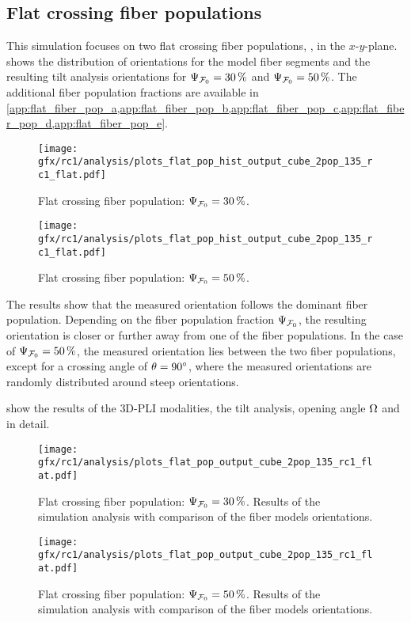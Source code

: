 \subsection{Flat crossing fiber populations}
\label{sec:resCrossFlat}
%
This simulation focuses on two flat crossing fiber populations, \ie{}, in the $x$-$y$-plane.
 shows the distribution of orientations for the model fiber segments and the resulting tilt analysis orientations for $\textnormal{$\Psi_{\textnormal{$\mathcal{F}_0$}}$} = \SI{30}{\percent}$ and $\textnormal{$\Psi_{\textnormal{$\mathcal{F}_0$}}$} = \SI{50}{\percent}$.
The additional fiber population fractions are available in \cref{app:flat_fiber_pop_a,app:flat_fiber_pop_b,app:flat_fiber_pop_c,app:flat_fiber_pop_d,app:flat_fiber_pop_e}.
\par
%
\begin{figure}[!p]
\centering
\texttt{[image: gfx/rc1/analysis/plots\_flat\_pop\_hist\_output\_cube\_2pop\_135\_rc1\_flat.pdf]}
\caption[]{Flat crossing fiber population: $\textnormal{$\Psi_{\textnormal{$\mathcal{F}_0$}}$}=\SI{30}{\percent}$.}
\label{fig:flat_03_fiber_pop_hist}
%
\vspace{2em}
\texttt{[image: gfx/rc1/analysis/plots\_flat\_pop\_hist\_output\_cube\_2pop\_135\_rc1\_flat.pdf]}
\caption[]{Flat crossing fiber population: $\textnormal{$\Psi_{\textnormal{$\mathcal{F}_0$}}$}=\SI{50}{\percent}$.}
\label{fig:flat_05_fiber_pop_hist}
\end{figure}
%
The results show that the measured orientation follows the dominant fiber population.
Depending on the fiber population fraction $\textnormal{$\Psi_{\textnormal{$\mathcal{F}_0$}}$}$, the resulting orientation is closer or further away from one of the fiber populations.
In the case of $\textnormal{$\Psi_{\textnormal{$\mathcal{F}_0$}}$} = \SI{50}{\percent}$, the measured orientation lies between the two fiber populations, except for a crossing angle of $\textnormal{$\theta$}=\SI{90}{\degree}$, where the measured orientations are randomly distributed around steep orientations.
\par
%
 show the results of the \ac{3D-PLI} modalities, the tilt analysis, opening angle $\textnormal{$\Omega$}$ and \accvalue{} in detail.
\par
%
\begin{figure}[!p]
\centering
\texttt{[image: gfx/rc1/analysis/plots\_flat\_pop\_output\_cube\_2pop\_135\_rc1\_flat.pdf]}
\caption[]{Flat crossing fiber population: $\textnormal{$\Psi_{\textnormal{$\mathcal{F}_0$}}$}=\SI{30}{\percent}$. Results of the simulation analysis with comparison of the fiber models orientations.}
\label{fig:flat_03_fiber_pop_rofl}
\end{figure}
%
\begin{figure}[!p]
\centering
\texttt{[image: gfx/rc1/analysis/plots\_flat\_pop\_output\_cube\_2pop\_135\_rc1\_flat.pdf]}
\caption[]{Flat crossing fiber population: $\textnormal{$\Psi_{\textnormal{$\mathcal{F}_0$}}$}=\SI{50}{\percent}$. Results of the simulation analysis with comparison of the fiber models orientations.}
\label{fig:flat_05_fiber_pop_rofl}
\end{figure}
